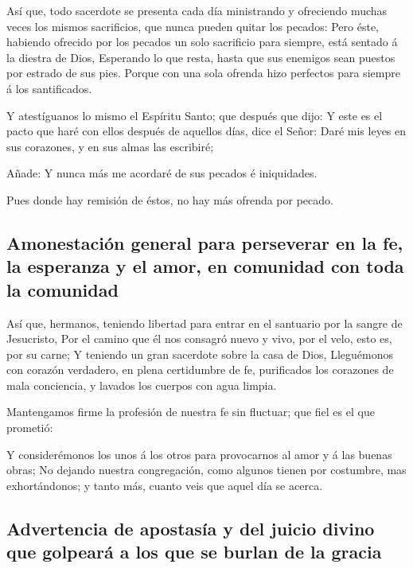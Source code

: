 Así que, todo sacerdote se presenta cada día ministrando y
ofreciendo muchas veces los mismos sacrificios, que nunca pueden quitar
los pecados:  Pero éste, habiendo ofrecido por los pecados
un solo sacrificio para siempre, está sentado á la diestra de Dios,
 Esperando lo que resta, hasta que sus enemigos sean
puestos por estrado de sus pies.  Porque con una sola
ofrenda hizo perfectos para siempre á los santificados.

 Y atestíguanos lo mismo el Espíritu Santo; que después que
dijo:  Y este es el pacto que haré con ellos después de
aquellos días, dice el Señor: Daré mis leyes en sus corazones, y en sus
almas las escribiré;

 Añade: Y nunca más me acordaré de sus pecados é
iniquidades.

 Pues donde hay remisión de éstos, no hay más ofrenda por
pecado.

\hypertarget{amonestaciuxf3n-general-para-perseverar-en-la-fe-la-esperanza-y-el-amor-en-comunidad-con-toda-la-comunidad}{%
\subsection{Amonestación general para perseverar en la fe, la esperanza
y el amor, en comunidad con toda la
comunidad}\label{amonestaciuxf3n-general-para-perseverar-en-la-fe-la-esperanza-y-el-amor-en-comunidad-con-toda-la-comunidad}}

 Así que, hermanos, teniendo libertad para entrar en el
santuario por la sangre de Jesucristo,  Por el camino que
él nos consagró nuevo y vivo, por el velo, esto es, por su carne;
 Y teniendo un gran sacerdote sobre la casa de Dios,
 Lleguémonos con corazón verdadero, en plena certidumbre de
fe, purificados los corazones de mala conciencia, y lavados los cuerpos
con agua limpia.

 Mantengamos firme la profesión de nuestra fe sin fluctuar;
que fiel es el que prometió:

 Y considerémonos los unos á los otros para provocarnos al
amor y á las buenas obras;  No dejando nuestra
congregación, como algunos tienen por costumbre, mas exhortándonos; y
tanto más, cuanto veis que aquel día se acerca.

\hypertarget{advertencia-de-apostasuxeda-y-del-juicio-divino-que-golpearuxe1-a-los-que-se-burlan-de-la-gracia}{%
\subsection{Advertencia de apostasía y del juicio divino que golpeará a
los que se burlan de la
gracia}\label{advertencia-de-apostasuxeda-y-del-juicio-divino-que-golpearuxe1-a-los-que-se-burlan-de-la-gracia}}

